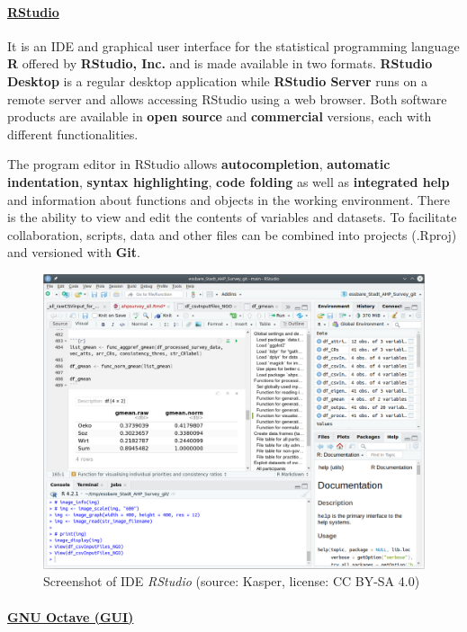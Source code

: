 \documentclass [oneside,10pt,a4paper,ngerman,BCOR10mm,headsepline,parindent,final]{scrartcl}
\begin{document}
    \hypertarget{rstudio}{%
\paragraph{\texorpdfstring{\href{https://en.wikipedia.org/wiki/RStudio}{RStudio}}{RStudio}}\label{rstudio}}

It is an IDE and graphical user interface for the statistical
programming language \textbf{R} offered by \textbf{RStudio, Inc.} and is
made available in two formats. \textbf{RStudio Desktop} is a regular
desktop application while \textbf{RStudio Server} runs on a remote
server and allows accessing RStudio using a web browser. Both software
products are available in \textbf{open source} and \textbf{commercial}
versions, each with different functionalities.

The program editor in RStudio allows \textbf{autocompletion},
\textbf{automatic indentation}, \textbf{syntax highlighting},
\textbf{code folding} as well as \textbf{integrated help} and
information about functions and objects in the working environment.
There is the ability to view and edit the contents of variables and
datasets. To facilitate collaboration, scripts, data and other files can
be combined into projects (.Rproj) and versioned with \textbf{Git}.

\begin{figure}
\centering
\includegraphics{images/Screenshot_RStudio.png}
\caption{Screenshot of IDE \emph{RStudio} (source: Kasper, license: CC
BY-SA 4.0)}
\end{figure}

    \hypertarget{gnu-octave-gui}{%
\paragraph{\texorpdfstring{\href{https://en.wikipedia.org/wiki/GNU_Octave\#User_interfaces}{GNU
Octave (GUI)}}{GNU Octave (GUI)}}\label{gnu-octave-gui}}
\end{document}
